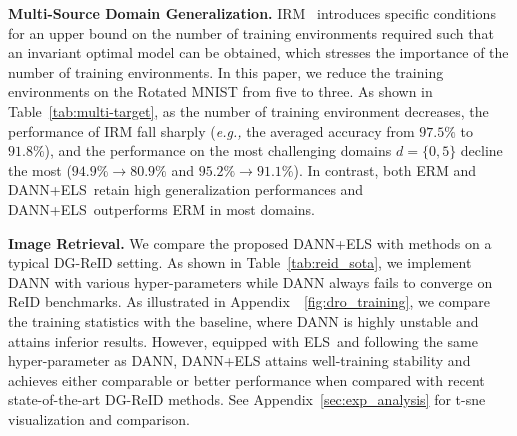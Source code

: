 \documentclass{article} \usepackage{iclr2023_conference,times}
\newcommand{\abbr}[0]{DANN+ELS\xspace}
\newcommand{\ls}[0]{ELS\xspace}
\newcommand{\eg}[0]{\textit{e.g., }}
\begin{document}
\noindent\textbf{Multi-Source Domain Generalization.} IRM~\citep{arjovsky2020invariant} introduces specific conditions for an upper bound on the number of training environments required such that an invariant optimal model can be obtained, which stresses the importance of the number of training environments. In this paper, we reduce the training environments on the Rotated MNIST from five to three. As shown in Table~\ref{tab:multi-target}, as the number of training environment decreases, the performance of IRM fall sharply (\eg the averaged accuracy from $97.5\%$ to $91.8\%$), and the performance on the most challenging domains $d=\{0,5\}$ decline the most ($94.9\%\rightarrow80.9\%$ and $95.2\%\rightarrow91.1\%$). In contrast, both ERM and \abbr~retain high generalization performances and \abbr~outperforms ERM in most domains. 

\textbf{Image Retrieval.} We compare the proposed \abbr with methods on a typical DG-ReID setting. As shown in Table~\ref{tab:reid_sota}, we implement DANN with various hyper-parameters while DANN always fails to converge on ReID benchmarks. As illustrated in Appendix~\figurename~\ref{fig:dro_training}, we compare the training statistics with the baseline, where DANN is highly unstable and attains inferior results. However, equipped with \ls~and following the same hyper-parameter as DANN, \abbr attains well-training stability and achieves either comparable or better performance when compared with recent state-of-the-art DG-ReID methods. See Appendix~\ref{sec:exp_analysis} for t-sne visualization and comparison.
\end{document}
